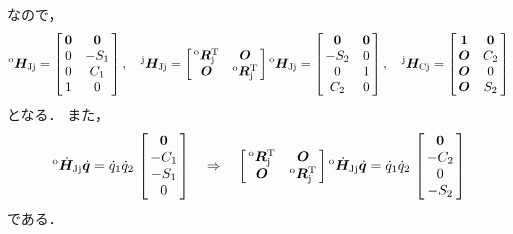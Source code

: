 ﻿\documentclass[a4paper]{jsarticle}
\begin{document}
なので，
\begin{align*}
{}^{\mathrm{o}}\bm{H}_{\mathrm{Jj}}=\left[\begin{array}{@{\,}cc@{\,}}
 \bm{0} & \bm{0} \\
  0 &-S_{1} \\
  0 & C_{1} \\
  1 & 0     \\
\end{array}\right],\quad
{}^{\mathrm{j}}\bm{H}_{\mathrm{Jj}}=\left[\begin{array}{@{\,}cc@{\,}}
 {}^{\mathrm{o}}\bm{R}_{\mathrm{j}}^{\mathrm{T}} & \bm{O} \\
 \bm{O} & {}^{\mathrm{o}}\bm{R}_{\mathrm{j}}^{\mathrm{T}} \\
\end{array}\right]{}^{\mathrm{o}}\bm{H}_{\mathrm{Jj}}
=\left[\begin{array}{@{\,}cc@{\,}}
 \bm{0} & \bm{0} \\
 -S_{2} & 0 \\
  0     & 1 \\
  C_{2} & 0 \\
\end{array}\right],\quad
{}^{\mathrm{j}}\bm{H}_{\mathrm{Cj}}=\left[\begin{array}{@{\,}cc@{\,}}
 \bm{1} & \bm{0} \\
 \bm{O} & C_{2} \\
 \bm{O} & 0     \\
 \bm{O} & S_{2} \\
\end{array}\right]
\end{align*}
となる．
また，
\begin{align*}
{}^{\mathrm{o}}\dot{\bm{H}}_{\mathrm{Jj}}\dot{\bm{q}}
=\dot{q}_{1}\dot{q}_{2}\,\left[\begin{array}{@{\,}c@{\,}}
 \bm{0} \\
  -C_{1} \\
  -S_{1} \\
   0     \\
\end{array}\right]\quad\Rightarrow\quad
\left[\begin{array}{@{\,}cc@{\,}}
 {}^{\mathrm{o}}\bm{R}_{\mathrm{j}}^{\mathrm{T}} & \bm{O} \\
 \bm{O} & {}^{\mathrm{o}}\bm{R}_{\mathrm{j}}^{\mathrm{T}} \\
\end{array}\right]
{}^{\mathrm{o}}\dot{\bm{H}}_{\mathrm{Jj}}\dot{\bm{q}}
=\dot{q}_{1}\dot{q}_{2}\,\left[\begin{array}{@{\,}c@{\,}}
 \bm{0} \\
-C_{2} \\
 0     \\
-S_{2} \\
\end{array}\right]
\end{align*}
である．
\end{document}
